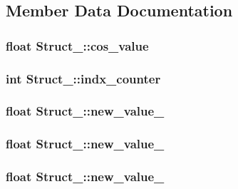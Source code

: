 \subsection{Member Data Documentation}
\hypertarget{structStruct__2_a9d87caa0748e84c9d015504e086b0d40}{
\subsubsection[{cos\_\-value}]{\setlength{\rightskip}{0pt plus 5cm}float {\bf Struct\_::cos\_\-value}}}
\label{structStruct__2_a9d87caa0748e84c9d015504e086b0d40}
\hypertarget{structStruct__2_a607d659ba63c564ccce86ac71b249db6}{
\subsubsection[{indx\_\-counter}]{\setlength{\rightskip}{0pt plus 5cm}int {\bf Struct\_::indx\_\-counter}}}
\label{structStruct__2_a607d659ba63c564ccce86ac71b249db6}
\hypertarget{structStruct__2_ad98d34b42204b07fe1c2ce69366f9ff2}{
\subsubsection[{new\_\-value\_\-1}]{\setlength{\rightskip}{0pt plus 5cm}float {\bf Struct\_::new\_\-value\_}}}
\label{structStruct__2_ad98d34b42204b07fe1c2ce69366f9ff2}
\hypertarget{structStruct__2_afd282d158493531b9adb48e6eecfdae1}{
\subsubsection[{new\_\-value\_\-2}]{\setlength{\rightskip}{0pt plus 5cm}float {\bf Struct\_::new\_\-value\_}}}
\label{structStruct__2_afd282d158493531b9adb48e6eecfdae1}
\hypertarget{structStruct__2_a49587eb5408782fe456d674f11c7f8d8}{
\subsubsection[{new\_\-value\_\-3}]{\setlength{\rightskip}{0pt plus 5cm}float {\bf Struct\_::new\_\-value\_}}}
